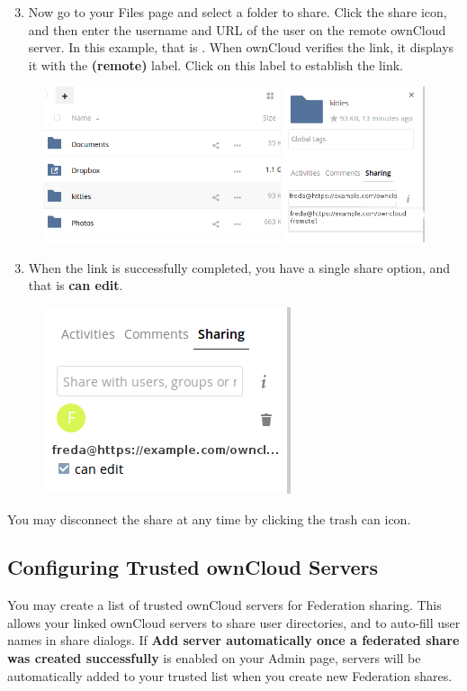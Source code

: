 \documentclass[letterpaper,10pt,english]{sphinxmanual}
\begin{document}
\begin{enumerate}
\setcounter{enumi}{2}
\item {} 
Now go to your Files page and select a folder to share. Click the share
icon, and then enter the username and URL of the user on the remote ownCloud
server. In this example, that is .
When ownCloud verifies the link, it displays it with the \textbf{(remote)} label.
Click on this label to establish the link.

\end{enumerate}
\begin{figure}[htbp]
\centering

\includegraphics{federation-2.png}
\end{figure}
\begin{enumerate}
\setcounter{enumi}{2}
\item {} 
When the link is successfully completed, you have a single share option,
and that is \textbf{can edit}.

\end{enumerate}
\begin{figure}[htbp]
\centering

\includegraphics{federation-3.png}
\end{figure}

You may disconnect the share at any time by clicking the trash can icon.


\subsection{Configuring Trusted ownCloud Servers}
\label{configuration_files/federated_cloud_sharing_configuration:configuring-trusted-owncloud-servers}
You may create a list of trusted ownCloud servers for Federation sharing. This
allows your linked ownCloud servers to share user directories, and to auto-fill
user names in share dialogs. If \textbf{Add server automatically once a federated
share was created successfully} is enabled on your Admin page, servers will be
automatically added to your trusted list when you create new Federation shares.
\end{document}
